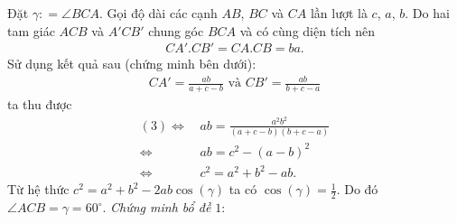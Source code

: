 \begin{multicols}{2}
\begin{figure}[H]
{}
		\vspace*{-10pt}
		\end{figure}
		Đặt $\gamma \colon = \angle BCA$. Gọi độ dài các cạnh $AB$, $BC$ và $CA$ lần lượt là $c$, $a$, $b$. 
		Do hai tam giác $ACB$ và $A'CB'$ chung góc $BCA$ và có cùng diện tích nên 
		\begin{align*}
			CA' . CB' = CA . CB = ba. 
		\end{align*}
		Sử dụng kết quả sau (chứng minh bên dưới):
		\begin{align*}
			CA' = \frac{ab}{a+c-b} \text{ và } CB' = \frac{ab}{b+c-a}
		\end{align*}
		ta thu được
		\begin{align*}
			(3) \Leftrightarrow \,& ab  = \frac{a^2b^2}{(a+c-b)(b+c-a)} \\
			\Leftrightarrow \,& ab = c^2 - (a-b)^2 \\
			\Leftrightarrow \,& c^2 = a^2 + b^2 - ab.
		\end{align*}
		Từ hệ thức $c^2 = a^2 + b^2 - 2 ab \cos(\gamma)$ ta có $\cos(\gamma) = \frac{1}{2}$. Do đó $\angle ACB = \gamma = 60^{\circ}$.
		\vskip 0.1cm
		\textit{Chứng minh bổ đề $1$}:
		\begin{figure}[H]
			\vspace*{-5pt}
			\centering
\end{figure}
\end{multicols}
